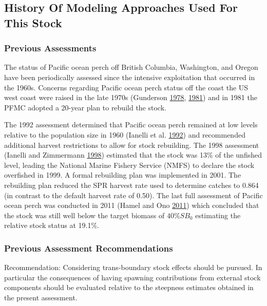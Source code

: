 \documentclass[12pt,]{article}
\begin{document}
\subsection{History Of Modeling Approaches Used For This
Stock}\label{history-of-modeling-approaches-used-for-this-stock}

\subsubsection{Previous Assessments}\label{previous-assessments}

The status of Pacific ocean perch off British Columbia, Washington, and
Oregon have been periodically assessed since the intensive exploitation
that occurred in the 1960s. Concerns regarding Pacific ocean perch
status off the coast the US west coast were raised in the late 1970s
(Gunderson \protect\hyperlink{ref-gunderson_results_1978}{1978},
\protect\hyperlink{ref-gunderson_updated_1981}{1981}) and in 1981 the
PFMC adopted a 20-year plan to rebuild the stock.

The 1992 assessment determined that Pacific ocean perch remained at low
levels relative to the population size in 1960 (Ianelli et al.
\protect\hyperlink{ref-ianelli_status_1992}{1992}) and recommended
additional harvest restrictions to allow for stock rebuilding. The 1998
assessment (Ianelli and Zimmermann
\protect\hyperlink{ref-ianelli_status_1998}{1998}) estimated that the
stock was 13\% of the unfished level, leading the National Marine
Fishery Service (NMFS) to declare the stock overfished in 1999. A formal
rebuilding plan was implemented in 2001. The rebuilding plan reduced the
SPR harvest rate used to determine catches to 0.864 (in contrast to the
default harvest rate of 0.50). The last full assessment of Pacific ocean
perch was conducted in 2011 (Hamel and Ono
\protect\hyperlink{ref-hamel_stock_2011}{2011}) which concluded that the
stock was still well below the target biomass of \(40\%SB_{0}\)
estimating the relative stock status at 19.1\%.

\subsubsection{Previous Assessment
Recommendations}\label{previous-assessment-recommendations}

Recommendation: Considering trans-boundary stock effects should be
pursued. In particular the consequences of having spawning contributions
from external stock components should be evaluated relative to the
steepness estimates obtained in the present assessment.
\end{document}
